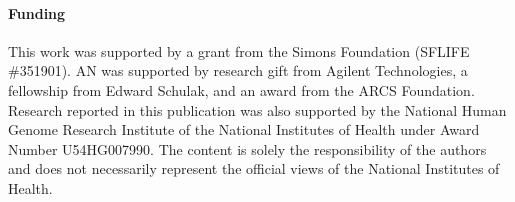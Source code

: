 \paragraph{Funding}
This work was supported by a grant from the Simons Foundation (SFLIFE \#351901). AN was supported by research gift from Agilent Technologies, a fellowship from Edward Schulak, and an award from the ARCS Foundation. Research reported in this publication was also supported by the National Human Genome Research Institute of the National Institutes of Health under Award Number U54HG007990. The content is solely the responsibility of the authors and does not necessarily represent the official views of the National Institutes of Health.

